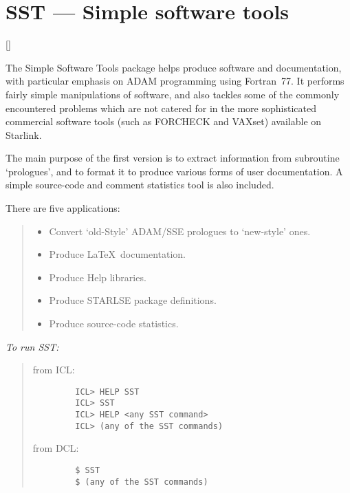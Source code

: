 \newpage

\section{SST --- Simple software tools} 

\vspace{-11mm}

\hfill []

\vspace{5mm}

The Simple Software Tools package helps produce software and documentation,
with particular emphasis on ADAM programming using Fortran~77. 
It performs fairly simple manipulations of software, and also tackles some of
the commonly encountered problems which are not catered for in the more
sophisticated commercial software tools (such as FORCHECK and VAXset)
available on Starlink. 

The main purpose of the first version is to extract information from subroutine
`prologues', and to format it to produce various forms of user documentation. 
A simple source-code and comment statistics tool is also included.

There are five applications:

{\small
\begin{quote}
\begin{itemize}
\item Convert `old-Style' ADAM/SSE prologues to `new-style' ones.
\item Produce \LaTeX\ documentation.
\item Produce Help libraries.
\item Produce STARLSE package definitions.
\item Produce source-code statistics.
\end{itemize}
\end{quote}
}

{\em To run SST:}\hfill
\begin{quote}
\begin{description}

\item [from ICL:]\hfill

\begin{small}
\begin{verbatim}
   ICL> HELP SST
   ICL> SST
   ICL> HELP <any SST command>
   ICL> (any of the SST commands)
\end{verbatim}
\end{small}

\item [from DCL:]\hfill

\begin{small}
\begin{verbatim}
   $ SST
   $ (any of the SST commands)
\end{verbatim}
\end{small}

\end{description}
\end{quote}

